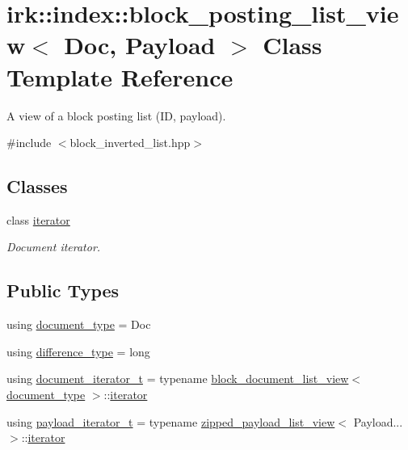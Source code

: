 \hypertarget{classirk_1_1index_1_1block__posting__list__view}{}\section{irk\+:\+:index\+:\+:block\+\_\+posting\+\_\+list\+\_\+view$<$ Doc, Payload $>$ Class Template Reference}
\label{classirk_1_1index_1_1block__posting__list__view}


A view of a block posting list (ID, payload).  




{\ttfamily \#include $<$block\+\_\+inverted\+\_\+list.\+hpp$>$}

\subsection*{Classes}
\begin{DoxyCompactItemize}
\item 
class \mbox{\hyperlink{classirk_1_1index_1_1block__posting__list__view_1_1iterator}{iterator}}
\begin{DoxyCompactList}\small\item\em Document iterator. \end{DoxyCompactList}\end{DoxyCompactItemize}
\subsection*{Public Types}
\begin{DoxyCompactItemize}
\item 
using \mbox{\hyperlink{classirk_1_1index_1_1block__posting__list__view_a4a778116d22c9cf347f38da132ca0900}{document\+\_\+type}} = Doc
\item 
using \mbox{\hyperlink{classirk_1_1index_1_1block__posting__list__view_a4298691f17976ec1cec5bc21ab6132ce}{difference\+\_\+type}} = long
\item 
using \mbox{\hyperlink{classirk_1_1index_1_1block__posting__list__view_a5b6c3f910a1bd819ff3efa0a619e32a0}{document\+\_\+iterator\+\_\+t}} = typename \mbox{\hyperlink{classirk_1_1index_1_1block__document__list__view}{block\+\_\+document\+\_\+list\+\_\+view}}$<$ \mbox{\hyperlink{classirk_1_1index_1_1block__posting__list__view_a4a778116d22c9cf347f38da132ca0900}{document\+\_\+type}} $>$\+::\mbox{\hyperlink{classirk_1_1index_1_1block__posting__list__view_1_1iterator}{iterator}}
\item 
using \mbox{\hyperlink{classirk_1_1index_1_1block__posting__list__view_ad7beed21d25c7cb3b2b389c28022be12}{payload\+\_\+iterator\+\_\+t}} = typename \mbox{\hyperlink{classirk_1_1index_1_1zipped__payload__list__view}{zipped\+\_\+payload\+\_\+list\+\_\+view}}$<$ Payload... $>$\+::\mbox{\hyperlink{classirk_1_1index_1_1block__posting__list__view_1_1iterator}{iterator}}
\end{DoxyCompactItemize}
